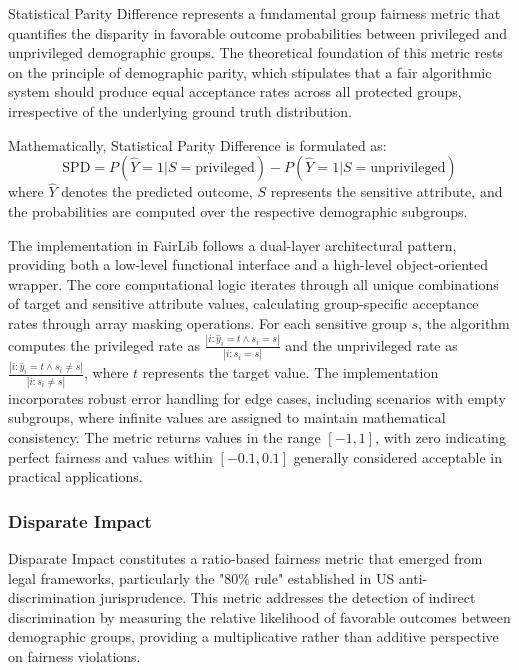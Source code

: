 \documentclass[12pt,a4paper,openright,twoside]{book}
\begin{document}
Statistical Parity Difference represents a fundamental group fairness metric that quantifies the disparity in favorable outcome probabilities between privileged and unprivileged demographic groups. The theoretical foundation of this metric rests on the principle of demographic parity, which stipulates that a fair algorithmic system should produce equal acceptance rates across all protected groups, irrespective of the underlying ground truth distribution.

Mathematically, Statistical Parity Difference is formulated as:
\begin{equation}
\text{SPD} = P(\hat{Y}=1|S=\text{privileged}) - P(\hat{Y}=1|S=\text{unprivileged})
\end{equation}
where $\hat{Y}$ denotes the predicted outcome, $S$ represents the sensitive attribute, and the probabilities are computed over the respective demographic subgroups.

The implementation in FairLib follows a dual-layer architectural pattern, providing both a low-level functional interface and a high-level object-oriented wrapper. The core computational logic iterates through all unique combinations of target and sensitive attribute values, calculating group-specific acceptance rates through array masking operations. For each sensitive group $s$, the algorithm computes the privileged rate as $\frac{|{i: \hat{y}_i = t \land s_i = s}|}{|{i: s_i = s}|}$ and the unprivileged rate as $\frac{|{i: \hat{y}_i = t \land s_i \neq s}|}{|{i: s_i \neq s}|}$, where $t$ represents the target value. The implementation incorporates robust error handling for edge cases, including scenarios with empty subgroups, where infinite values are assigned to maintain mathematical consistency. The metric returns values in the range $[-1, 1]$, with zero indicating perfect fairness and values within $[-0.1, 0.1]$ generally considered acceptable in practical applications.

\subsubsection{Disparate Impact}

Disparate Impact constitutes a ratio-based fairness metric that emerged from legal frameworks, particularly the "80\% rule" established in US anti-discrimination jurisprudence. This metric addresses the detection of indirect discrimination by measuring the relative likelihood of favorable outcomes between demographic groups, providing a multiplicative rather than additive perspective on fairness violations.
\end{document}
